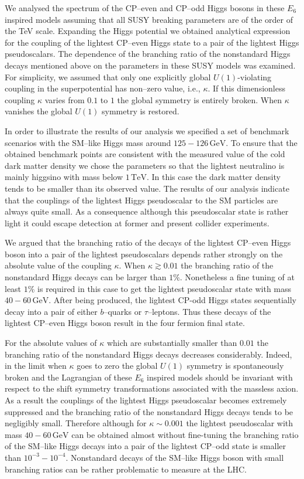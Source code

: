 \documentclass[12pt,a4paper]{article}
\begin{document}
We analysed the spectrum of the CP--even and CP--odd Higgs bosons in these $E_6$ inspired models
assuming that all SUSY breaking parameters are of the order of the TeV scale. Expanding the Higgs potential
we obtained analytical expression for the coupling of the lightest CP--even Higgs state to a pair of the lightest
Higgs pseudoscalars. The dependence of the branching ratio of the nonstandard Higgs decays mentioned above
on the parameters in these SUSY models was examined. For simplicity, we assumed that 
only one explicitly global $U(1)$-violating coupling
in the superpotential has non--zero value, i.e., $\kappa$. If this dimensionless
coupling $\kappa$ varies from $0.1$ to $1$ the global symmetry is entirely broken.
When $\kappa$ vanishes
the global $U(1)$ symmetry is restored.

In order to illustrate the results of our analysis we
specified a set of benchmark scenarios with the SM--like Higgs mass around $125-126\,\mbox{GeV}$.
To ensure that the obtained benchmark points are consistent with the measured value of the cold dark matter
density we chose the parameters so that the lightest neutralino is mainly higgsino with mass below $1\,\mbox{TeV}$.
In this case the dark matter density tends to be smaller than its observed value. The results of our analysis indicate
that the couplings of the lightest Higgs pseudoscalar to the SM particles are always quite small. As a consequence
although this pseudoscalar state is rather light it could escape detection at former and present collider experiments.

We argued that the branching ratio of the decays of the lightest CP--even Higgs boson into a pair of the lightest
pseudoscalars depends rather strongly on the absolute value of the coupling $\kappa$.
 When $\kappa\gtrsim 0.01$
the branching ratio of the nonstandard Higgs decays can be larger than $1\%$. Nonetheless a fine tuning of at least
$1\%$ is required in this case to get the lightest pseudoscalar state with mass $40-60\,\mbox{GeV}$.
After being produced, the lightest CP-odd Higgs states sequentially decay into a pair of either $b$--quarks or
$\tau$--leptons. Thus these decays of the lightest CP--even Higgs boson result in the four fermion final state.

For the absolute values of $\kappa$ which are substantially smaller than $0.01$ the branching ratio of the
nonstandard Higgs decays decreases considerably. Indeed, in the limit when $\kappa$ goes to zero the
global $U(1)$ symmetry is spontaneously broken and the Lagrangian of these $E_6$ inspired models should be
invariant with respect to the shift symmetry transformations associated with the massless axion. As a result the
couplings of the lightest Higgs pseudoscalar becomes extremely suppressed and the branching ratio of the
nonstandard Higgs decays tends to be negligibly small. Therefore although for $\kappa\sim 0.001$ the lightest
pseudoscalar with mass $40-60\,\mbox{GeV}$ can be obtained almost without fine-tuning the branching ratio
of the SM--like Higgs decays into a pair of the lightest CP--odd state is smaller than $10^{-3}-10^{-4}$.
Nonstandard decays of the SM--like Higgs boson with small branching ratios can be
rather problematic
to measure at the LHC.
\end{document}
